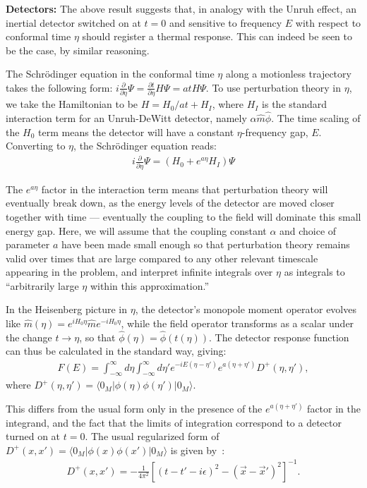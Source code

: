 \documentclass[aps,prl,showpacs,12pt]{revtex4}
\begin{document}
\textbf{Detectors:} The above result suggests that, in analogy with the Unruh effect, an inertial detector switched on at $t=0$ and sensitive to frequency $E$ with respect to conformal time $\eta$ should register a thermal response.  This can indeed be seen to be the case, by similar reasoning.

The Schr\"odinger equation in the conformal time $\eta$ along a motionless trajectory takes the following form:  $i \frac{\partial}{\partial \eta} \Psi = \frac{\partial t}{\partial \eta} H \Psi = atH \Psi $.  To use perturbation theory in $\eta$, we take the Hamiltonian to be $H = H_{0}/at + H_{I}$, where $H_{I}$ is the standard interaction term for an Unruh-DeWitt detector, namely $\alpha \hat{m} \hat{\phi}$.  The time scaling of the $H_{0}$ term means the detector will have a constant $\eta$-frequency gap, $E$.  Converting to $\eta$, the Schr\"odinger equation reads:
\begin{eqnarray*}
i \frac{\partial}{\partial \eta} \Psi = \left( H_{0} + e^{a \eta} H_{I}\right) \Psi
\end{eqnarray*}

The $e^{a \eta}$ factor in the interaction term means that perturbation theory will eventually break down, as the energy levels of the detector are moved closer together with time \---- eventually the coupling to the field will dominate this small energy gap.  Here, we will assume that the coupling constant $\alpha$ and choice of parameter $a$ have been made small enough so that perturbation theory remains valid over times that are large compared to any other relevant timescale appearing in the problem, and interpret infinite integrals over $\eta$ as integrals to ``arbitrarily large $\eta$ within this approximation.''

In the Heisenberg picture in $\eta$, the detector's monopole moment operator evolves like $\hat{m}(\eta) = e^{i H_{0} \eta} \hat{m} e^{-i H_{0} \eta}$, while the field operator transforms as a scalar under the change $t \rightarrow \eta$, so that $\hat{\phi}(\eta) = \hat{\phi}(t(\eta))$.  The detector response function can thus be calculated in the standard way, giving:
\begin{eqnarray*}
F(E) = \int_{-\infty}^{\infty} d \eta \int_{- \infty}^{\infty} d \eta' e^{-iE(\eta - \eta')} e^{a(\eta + \eta')} D^{+}(\eta, \eta'), 
\end{eqnarray*}
where $D^{+}(\eta, \eta')= \langle 0_{M} | \phi(\eta) \phi(\eta') |0_{M} \rangle.$

This differs from the usual form only in the presence of the $e^{a(\eta + \eta')}$ factor in the integrand, and the fact that the limits of integration correspond to a detector turned on at $t=0$.  The usual regularized form of $D^{+}(x, x') = \langle 0_{M} | \phi(x) \phi(x') |0_{M} \rangle$ is given by~\cite{birrell1}:
\begin{eqnarray*}
 D^{+}(x, x') = - \frac{1}{4 \pi^2} \left[ (t - t' - i \epsilon)^{2} - (\vec{x} - \vec{x}')^{2} \right]^{-1}.
\end{eqnarray*}
\end{document}
